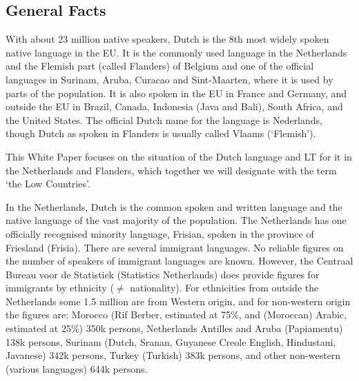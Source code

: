 \documentclass[]{../../metanetpaper}
\begin{document}

\begin{multicols}{2}

\subsection{General Facts}

    With about 23 million native speakers, Dutch is the 8th most widely spoken native language in the EU. It is the commonly used language in the Netherlands and the Flemish part (called Flanders) of Belgium and one of the official languages in Surinam, Aruba, Curacao and Sint-Maarten, where it is used by parts of the population. It is also spoken in the EU in France and Germany, and outside the EU in Brazil, Canada, Indonesia (Java and Bali), South Africa, and the United States.  The official Dutch name for the language is Nederlands, though Dutch as spoken in Flanders is usually called Vlaams (`Flemish').

    This White Paper focuses on the situation of the Dutch language and LT for it in the Netherlands and Flanders, which together we will designate with the term `the Low Countries'.

    In the Netherlands, Dutch is the common spoken and written language and the native language of the vast majority of the population. The Netherlands has one officially recognised minority language, Frisian, spoken in the province of Friesland (Frisia). There are several immigrant languages. No reliable figures on the number of speakers of immigrant languages are known. However, the Centraal Bureau voor de Statistiek (Statistics Netherlands) \cite{CBS}  does provide figures for immigrants by ethnicity ($\neq$ nationality). For ethnicities from outside the Netherlands some 1.5 million are from Western origin, and for non-western origin the figures are: Morocco (Rif Berber, estimated at 75\%, and (Moroccan) Arabic, estimated at 25\%) 350k persons, Netherlands Antilles and Aruba (Papiamentu) 138k persons, Surinam (Dutch, Sranan, Guyanese Creole English, Hindustani, Javanese) 342k persons, Turkey (Turkish) 383k persons, and other non-western (various languages) 644k persons.



\end{multicols}
\end{document}
